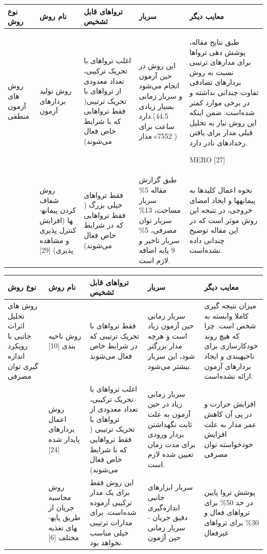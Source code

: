 \begin{table}
	\label{tcomparison}
	\begin{tabular}{|p{1cm}||p{3cm}|p{3cm}|p{3cm}|p{3cm}|}
		\hline

		نوع روش & نام روش  & تروا‌های قابل ئشخیص & سربار& معایب دیگر \\ \hline \hline
		روش ‌های آزمون منطقی& روش تولید بردارهای آزمون&اغلب تروا‌های با تحریک ترکیبی، تعداد معدودی از تروا‌های با تحریک ترتیبی(  فقط تروا‌هایی که با شرایط خاص فعال می‌شوند)&این روش در حین آزمون انجام می‌شود و سربار زمانی بسیار زیادی دارد.(44.5 ساعت برای مدار c7552 )&طبق نتایج مقاله، پوشش دهی تروا‌ها برای مدارهای ترتیبی نسبت به روش بردارهای تصادفی تفاوت چندانی نداشته و در برخی موارد کمتر شده‌است. ضمن اینکه  این روش نیاز به تحلیل قبلی مدار برای یافتن رخدادهای نادر دارد.
		
		MERO [27]
		
		\\ \cline{2-5}
		&روش شفاف کردن پیمانه­ها (افزایش کنترل پذیری و مشاهده پذیری) [29]  &فقط تروا‌های خیلی بزرگ ( فقط تروا‌هایی که در شرایط خاص فعال می‌شوند)&طبق گزارش مقاله 5\% سربار مساحت، 13\% سربار توان مصرفی، 5\% سربار تاخیر و 9 پایه اضافه لازم است. & نحوه اعمال کلیدها به پیمانه­ها و ایجاد امضای خروجی، در نتیجه این روش موثر است که در این مقاله توضیح چندانی داده نشده‌است.
		
	\end{tabular}
\end{table}
\newpage
\begin{table}
	\begin{tabular}{|p{1cm}||p{3cm}|p{3cm}|p{3cm}|p{3cm}|}
نوع روش & نام روش  & تروا‌های قابل ئشخیص & سربار& معایب دیگر \\ \hline \hline
		روش ‌های تحلیل اثرات جانبی با رویکرد اندازه ‌گیری توان مصرفی&روش ناحیه بندی [10]  &فقط تروا‌های با تحریک ترتیبی که در شرایط خاص فعال می‌شوند &سربار زمانی حین آزمون زیاد است و هرچه مدار بزرگتر شود، این سربار بیشتر می‌شود. &میزان نتیجه گیری کاملا وابسته به شخص است. چرا که هیچ روند خودکار­سازی برای ناحیه­بندی و ایجاد بردارهای آزمون ارائه نشده‌است. 

		

		\\ \cline{2-5}
		&روش اعمال بردارهای پایدار شده [24]  &اغلب تروا‌های با تحریک ترکیبی، تعداد معدودی از تروا‌های با تحریک ترتیبی ( فقط تروا‌هایی که با شرایط خاص فعال می‌شوند)  &سربار زمانی زیاد در حین آزمون به علت ثابت نگهداشتن بردار ورودی برای مدت زمان تعیین شده لازم ‌است. &افزایش حرارت و در پی آن کاهش عمر مدار به علت افزایش خودخواسته توان مصرفی
		
		\\ \cline{2-5}
		& روش محاسبه جریان از طریق پایه­های تغذیه مختلف [6] &این روش فقط برای یک مدار ترکیبی آزموده شده‌است. برای مدارات ترتیبی خیلی مناسب نخواهد بود. & سربار ابزارهای جانبی اندازه‌گیری دقیق جریان - سربار زمانی حین آزمون&پوشش تروا پایین در حد 50\% برای تروا‌های فعال و 30\% برای تروا‌های غیرفعال 

	\end{tabular}
\end{table}
